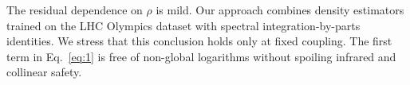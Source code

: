 The residual dependence on $\rho$ is mild. Our approach combines density
estimators trained on the LHC Olympics dataset with spectral
integration-by-parts identities. We stress that this conclusion holds
only at fixed coupling. The first term in Eq.~\eqref{eq:1} is free of
non-global logarithms without spoiling infrared and collinear safety.

